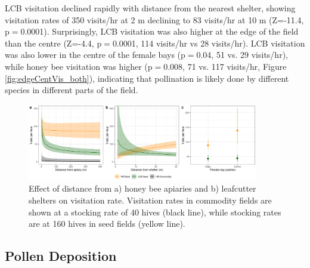 \documentclass[12pt]{article} %
\begin{document}
LCB visitation declined rapidly with distance from the nearest shelter, showing visitation rates of 350 visits/hr at 2 m declining to 83 visits/hr at 10 m (Z=-11.4, p$=$0.0001). 
Surprisingly, LCB visitation was also higher at the edge of the field than the centre (Z=-4.4, p$=$0.0001, 114 visits/hr vs 28 visits/hr).
LCB visitation was also lower in the centre of the female bays (p$=$0.04, 51 vs. 29 visits/hr), while honey bee visitation was higher (p$=$0.008, 71 vs. 117 visits/hr, Figure \ref{fig:edgeCentVis_both}), indicating that pollination is likely done by different species in different parts of the field.

\begin{figure}
    \centering
    \includegraphics[width=0.9\textwidth,keepaspectratio=true]{../Figures/allVisits.png}
    \caption{Effect of distance from a) honey bee apiaries and b) leafcutter shelters on visitation rate. Visitation rates in commodity fields are shown at a stocking rate of 40 hives (black line), while stocking rates are at 160 hives in seed fields (yellow line).}
    \label{fig:hbeeDist_commodity}
\end{figure}

\subsection{Pollen Deposition}
\end{document}
